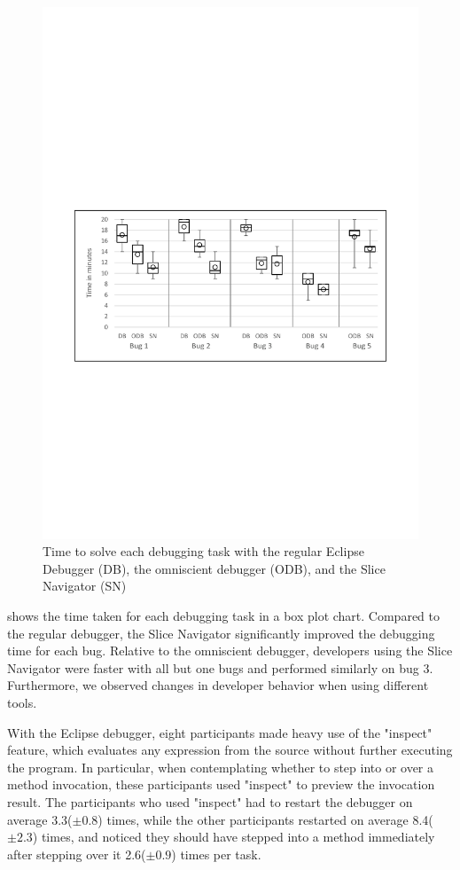 \documentclass[
			english,
			]{elsarticle}
\begin{document}
\begin{figure}
	\centering %
		\includegraphics[width=\linewidth]{chart-times3.pdf}
	\caption{Time to solve each debugging task with the regular Eclipse Debugger (DB), the omniscient debugger (ODB), and the Slice Navigator (SN)}
	\label{fig:charttimes}
\end{figure}

 shows the time taken for each debugging task in a box plot chart.
Compared to the regular debugger, the Slice Navigator significantly improved the debugging time for each bug.
Relative to the omniscient debugger, developers using the Slice Navigator were faster with all but one bugs and performed similarly on bug 3.
Furthermore, we observed changes in developer behavior when using different tools.

With the Eclipse debugger, eight participants made heavy use of the "inspect" feature, which evaluates any expression from the source without further executing the program.
In particular, when contemplating whether to step into or over a method invocation, these participants used "inspect" to preview the invocation result.
The participants who used "inspect" had to restart the debugger on average 3.3($\pm0.8$) times, while the other participants restarted on average 8.4($\pm2.3$) times, and noticed they should have stepped into a method immediately after stepping over it 2.6($\pm0.9$) times per task.
\end{document}
